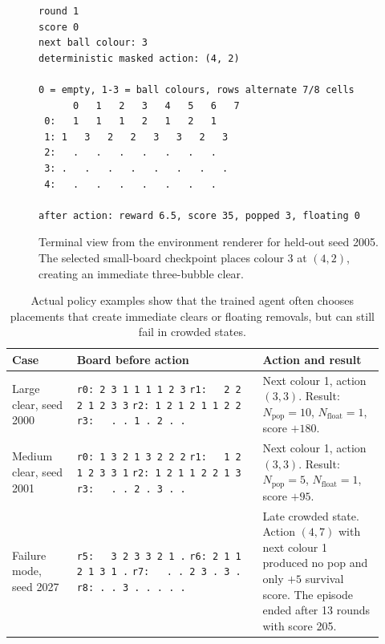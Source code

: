\documentclass[10pt,a4paper]{article}
\begin{document}
\begin{figure}[H]
\centering
\begin{minipage}{0.94\linewidth}
\scriptsize
\begin{verbatim}
round 1
score 0
next ball colour: 3
deterministic masked action: (4, 2)

0 = empty, 1-3 = ball colours, rows alternate 7/8 cells
      0   1   2   3   4   5   6   7
 0:   1   1   1   2   1   2   1
 1: 1   3   2   2   3   3   2   3
 2:   .   .   .   .   .   .   .
 3: .   .   .   .   .   .   .   .
 4:   .   .   .   .   .   .   .

after action: reward 6.5, score 35, popped 3, floating 0
\end{verbatim}
\end{minipage}
\caption{Terminal view from the environment renderer for held-out seed 2005. The selected small-board checkpoint places colour 3 at \((4,2)\), creating an immediate three-bubble clear.}
\label{fig:terminal-view}
\end{figure}

\begin{table}[H]
\centering
\caption{Actual policy examples show that the trained agent often chooses placements that create immediate clears or floating removals, but can still fail in crowded states.}
\label{tab:policy-examples}
\scriptsize
\begin{tabular}{p{0.16\linewidth}p{0.46\linewidth}p{0.30\linewidth}}
\toprule
Case & Board before action & Action and result \\
\midrule
Large clear, seed 2000 &
\texttt{r0: 2 3 1 1 1 1 2 3}\newline
\texttt{r1: \ \ 2 2 2 1 2 3 3}\newline
\texttt{r2: 1 2 1 2 1 1 2 2}\newline
\texttt{r3: \ \ . . 1 . 2 . .}
&
Next colour 1, action \((3,3)\). Result: \(N_{\mathrm{pop}}=10\), \(N_{\mathrm{float}}=1\), score \(+180\). \\
\midrule
Medium clear, seed 2001 &
\texttt{r0: 1 3 2 1 3 2 2 2}\newline
\texttt{r1: \ \ 1 2 1 2 3 3 1}\newline
\texttt{r2: 1 2 1 1 2 2 1 3}\newline
\texttt{r3: \ \ . . 2 . 3 . .}
&
Next colour 1, action \((3,3)\). Result: \(N_{\mathrm{pop}}=5\), \(N_{\mathrm{float}}=1\), score \(+95\). \\
\midrule
Failure mode, seed 2027 &
\texttt{r5: \ \ 3 2 3 3 2 1 .}\newline
\texttt{r6: 2 1 1 2 1 3 1 .}\newline
\texttt{r7: \ \ . . 2 3 . 3 .}\newline
\texttt{r8: . . 3 . . . . .}
&
Late crowded state. Action \((4,7)\) with next colour 1 produced no pop and only \(+5\) survival score. The episode ended after 13 rounds with score 205. \\
\bottomrule
\end{tabular}
\end{table}
\end{document}

